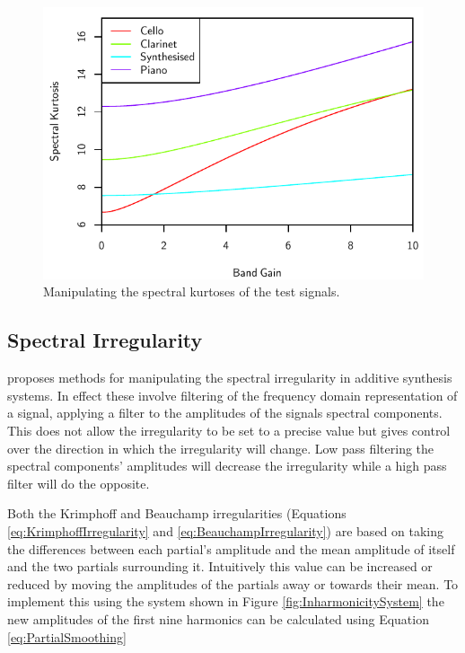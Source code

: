 			\begin{figure}[h!]
				\centering
				\includegraphics{chapter6/Images/MoveKurtoses.pdf}
				\caption{Manipulating the spectral kurtoses of the test signals.}
				\label{fig:MoveKurtoses}
			\end{figure}

	\subsection{Spectral Irregularity}
	\label{sec:FeatureControl-Parameterisation-Irregularity}
		\citet{beauchamp2007analysis} proposes methods for manipulating the spectral irregularity in additive
		synthesis systems. In effect these involve filtering of the frequency domain representation of a signal,
		applying a filter to the amplitudes of the signals spectral components.  This does not allow the
		irregularity to be set to a precise value but gives control over the direction in which the irregularity
		will change. Low pass filtering the spectral components' amplitudes will decrease the irregularity while a
		high pass filter will do the opposite.
		
		Both the Krimphoff and Beauchamp irregularities (Equations \ref{eq:KrimphoffIrregularity} and
		\ref{eq:BeauchampIrregularity}) are based on taking the differences between each partial's amplitude and
		the mean amplitude of itself and the two partials surrounding it. Intuitively this value can be increased
		or reduced by moving the amplitudes of the partials away or towards their mean. To implement this using the
		system shown in Figure \ref{fig:InharmonicitySystem} the new amplitudes of the first nine harmonics can be
		calculated using Equation \ref{eq:PartialSmoothing}

